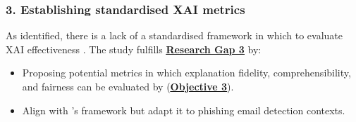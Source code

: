 
\subsubsection*{3. Establishing standardised XAI metrics}
As identified, there is a lack of a standardised framework in which to evaluate XAI effectiveness \citep{reddy2023explainable}. The study fulfills \hyperref[research-gap-3]{\uline{\textbf{Research Gap 3}}} by:

\begin{itemize}
  \item Proposing potential metrics in which explanation fidelity, comprehensibility, and fairness can be evaluated by (\hyperref[objective-3]{\uline{\textbf{Objective 3}}}).
  \item Align with \cite{shendkar2024enhancing}'s framework but adapt it to phishing email detection contexts.
\end{itemize}
